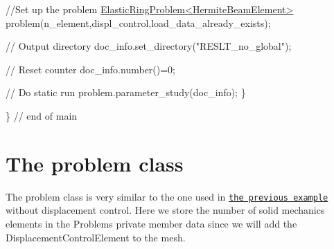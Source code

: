 \begin{DoxyCodeInclude}
  \textcolor{comment}{//Set up the problem}
  \hyperlink{classElasticRingProblem}{ElasticRingProblem<HermiteBeamElement>} 
   problem(n\_element,displ\_control,load\_data\_already\_exists);
  
  \textcolor{comment}{// Output directory}
  doc\_info.set\_directory(\textcolor{stringliteral}{"RESLT\_no\_global"});
  
  \textcolor{comment}{// Reset counter}
  doc\_info.number()=0;

  \textcolor{comment}{// Do static run}
  problem.parameter\_study(doc\_info);
 \}

\} \textcolor{comment}{// end of main}

\end{DoxyCodeInclude}




\hypertarget{index_problem_class}{}\section{The problem class}\label{index_problem_class}
The problem class is very similar to the one used in \href{../../tensioned_string/html/index.html}{\tt the previous example} without displacement control. Here we store the number of solid mechanics elements in the Problem\textquotesingle{}s private member data since we will add the {\ttfamily Displacement\+Control\+Element} to the mesh.

